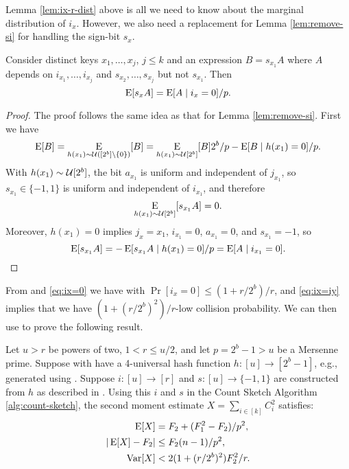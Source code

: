 Lemma \ref{lem:ix-r-dist} above is all we need to know about the
marginal distribution of $i_x$. However, we also need a replacement
for Lemma \ref{lem:remove-si} for handling the sign-bit $s_x$.
\begin{lemma}\label{lem:remove-si-r-dist} Consider distinct keys
   $x_1,\ldots,x_j$, $j\leq k$ and an expression $B=s_{x_1}A$ where $A$
   depends on $i_{x_1},\ldots,i_{x_j}$ and $s_{x_2},\ldots,s_{x_j}$ but not
   $s_{x_1}$. 
   Then
   \begin{equation}\label{eq:remove-si-r-dist}
      \operatorname*{E}[s_xA]=\operatorname*{E}[A \mid i_x=0]/p.
   \end{equation}
\end{lemma}
\begin{proof}
   The proof follows the same idea as that for Lemma \ref{lem:remove-si}.
   First we have
   \[\operatorname*{E}[B]=\operatorname*{E}_{h(x_1) \sim \mathcal{U}([2^b]\setminus\{0\})}[B]=\operatorname*{E}_{h(x_1) \sim \mathcal{U}[2^b]}[B]2^b/p-\operatorname*{E}[B \mid h(x_1)=0]/p.\]
   With $h(x_1)\sim \mathcal{U}[2^b]$, the bit $a_{x_1}$ is uniform and 
   independent of $j_{x_1}$, so $s_{x_1}\in\{-1,1\}$ is uniform and 
   independent of $i_{x_1}$, and therefore 
   \[\operatorname*{E}_{h(x_1) \sim \mathcal{U}[2^b]}[s_{x_1}A]=0.\]
   Moreover, $h(x_1)=0$ implies $j_x={x_1}$, $i_{x_1}=0$, $a_{x_1}=0$,
   and $s_{x_1}=-1$,
   so 
   \[\operatorname*{E}[s_{x_1}A]=-\operatorname*{E}[s_{x_1}A \mid h(x_1)=0]/p=\operatorname*{E}[A \mid i_{x_1}=0].\]
\end{proof}

From  and \eqref{eq:ix=0} we have 
with $\Pr[i_x = 0] \le (1 + r/2^b)/r$, and \eqref{eq:ix=iy} implies that we have
$(1 + (r/2^b)^2)/r$-low collision probability. We can then use
 to prove the following result.
\begin{theorem}\label{thm:h-and-s-p-arb-r}
   Let $u>r$ be powers of two, $1 < r \le u/2$, and let $p=2^b-1>u$ be a
   Mersenne prime.
   Suppose with have a 4-universal hash function $h:[u]\to[2^b-1]$, e.g.,
   generated using . Suppose
   $i:[u]\to[r]$ and
   $s:[u]\to\{-1,1\}$ are constructed from $h$ as described in
   . Using this $i$ and $s$ 
   in the Count Sketch Algorithm \ref{alg:count-sketch}, the second moment 
   estimate $X=\sum_{i\in[k]} C_i^2$ satisfies:
   \begin{align}
      \operatorname*{E}[X] &= F_2+(F_1^2-F_2)/p^2, \label{eq:E-F2-p-arb-r}\\
      | \operatorname*{E}[X] - F_2 | &\le F_2 (n - 1)/p^2, \label{eq:E-F2-p-com-arb-r}\\
      \operatorname*{Var}[X]&< 2(1 + (r/2^b)^2)F_2^2/r.\label{eq:V-F2-p-arb-r}
   \end{align}
\end{theorem}

